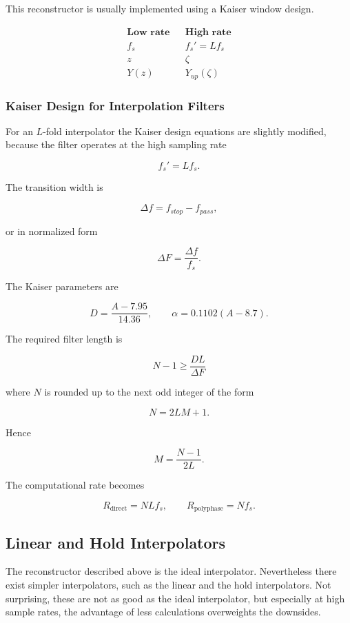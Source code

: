 This reconstructor is usually implemented using a Kaiser window design.

\[
\boxed{
\begin{array}{ccc}
\textbf{Low rate} && \textbf{High rate}\\[1mm]
f_s && f_s'=Lf_s\\
z && \zeta\\
Y(z) && Y_{up}(\zeta)
\end{array}
}
\]

\subsubsection{Kaiser Design for Interpolation Filters}

For an $L$-fold interpolator the Kaiser design equations are slightly modified,
because the filter operates at the high sampling rate

\[
f_s'=Lf_s.
\]

The transition width is

\[
\Delta f=f_{stop}-f_{pass},
\]

or in normalized form

\[
\Delta F=\frac{\Delta f}{f_s}.
\]

The Kaiser parameters are

\[
D=\frac{A-7.95}{14.36},
\qquad
\alpha=0.1102(A-8.7).
\]

The required filter length is

\[
\boxed{
N-1\ge
\frac{DL}{\Delta F}
}
\]

where $N$ is rounded up to the next odd integer of the form

\[
N=2LM+1.
\]

Hence

\[
\boxed{
M=\frac{N-1}{2L}.
}
\]

The computational rate becomes

\[
\boxed{
R_{\text{direct}}
=
NLf_s,
\qquad
R_{\text{polyphase}}
=
Nf_s.
}
\]

\subsection{Linear and Hold Interpolators}
The reconstructor described above is the ideal interpolator. Nevertheless
there exist simpler interpolators, such as the linear and the hold interpolators.
Not surprising, these are not as good as the ideal interpolator, but especially
at high sample rates, the advantage of less calculations overweights the
downsides.

